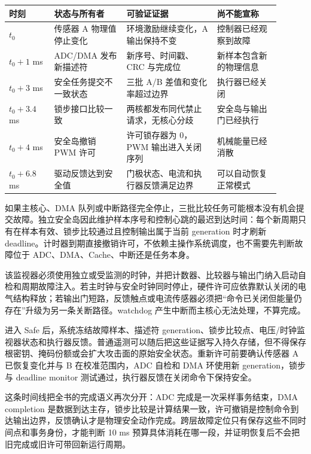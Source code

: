 \begin{longtable}{L{0.15\linewidth}L{0.24\linewidth}L{0.30\linewidth}L{0.21\linewidth}}
\toprule
时刻 & 状态与所有者 & 可验证证据 & 尚不能宣称 \\
\midrule
$t_0$ & 传感器 A 物理值停止变化 & 环境激励继续变化，A 输出保持不变 & 控制器已经观察到故障 \\\tablerowrule
$t_0+1$ ms & ADC/DMA 发布新描述符 & 新序号、时间戳、CRC 与完成位 & 新样本包含新的物理信息 \\\tablerowrule
$t_0+3$ ms & 安全任务提交不一致状态 & 三批 A/B 差值和变化率超过边界 & 执行器已经关闭 \\\tablerowrule
$t_0+3.4$ ms & 锁步接口比较一致 & 两核都发布同代禁止请求，无核心分歧 & 安全岛与输出门已经执行 \\\tablerowrule
$t_0+4$ ms & 安全岛撤销 PWM 许可 & 许可锁存器为 0，PWM 输出进入关闭序列 & 机械能量已经消散 \\\tablerowrule
$t_0+6.8$ ms & 驱动反馈达到安全值 & 门极状态、电流和执行器反馈满足边界 & 可以自动恢复正常模式 \\
\bottomrule
\end{longtable}


如果主核心、DMA 队列或中断路径完全停止，三批比较任务可能根本没有机会提交故障。独立安全岛因此维护样本序号和控制心跳的最迟到达时间：每个新周期只有在样本有效、锁步比较通过且控制输出属于当前 generation 时才刷新 deadline。计时器到期直接撤销许可，不依赖主操作系统调度，也不需要先判断故障位于 ADC、DMA、Cache、中断还是任务本身。

该监视器必须使用独立或受监测的时钟，并把计数器、比较器与输出门纳入启动自检和周期故障注入。若主时钟与安全时钟同时停止，硬件许可应依靠默认关闭的电气结构释放；若输出门短路，反馈触点或电流传感器必须把“命令已关闭但能量仍存在”升级为另一条关断路径。watchdog 产生中断而主核心无法处理，不算完成。


进入 Safe 后，系统冻结故障样本、描述符 generation、锁步比较点、电压/时钟监视器状态和执行器反馈。普通遥测可以随后把这些证据写入持久存储，但不得保存根密钥、掩码份额或会扩大攻击面的原始安全状态。重新许可前要确认传感器 A 已恢复变化并与 B 在校准范围内，ADC 自检和 DMA 环使用新 generation，锁步与 deadline monitor 测试通过，执行器反馈在关闭命令下保持安全。

这条时间线把全书的完成语义再次分开：ADC 完成是一次采样事务结束，DMA completion 是数据到达主存，锁步比较是计算结果一致，许可撤销是控制命令到达输出边界，反馈确认才是物理安全动作完成。跨层故障定位只有保存这些不同时间点和事务身份，才能判断 10 ms 预算具体消耗在哪一段，并证明恢复后不会把旧完成或旧许可带回新运行周期。
